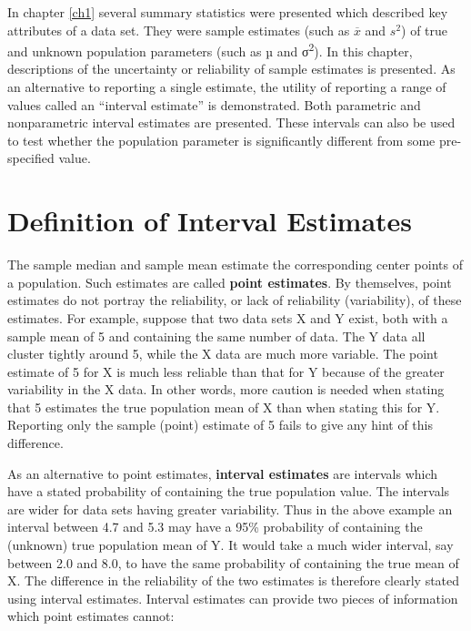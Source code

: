 \documentclass[]{book}
\begin{document}
In chapter \ref{ch1} several summary statistics were presented which described key attributes of a data set. They were sample estimates (such as \(\overline{x}\) and \(s^{2}\)) of true and unknown population parameters (such as µ and σ\textsuperscript{2}). In this chapter, descriptions of the uncertainty or reliability of sample estimates is presented. As an alternative to reporting a single estimate, the utility of reporting a range of values called an ``interval estimate'' is demonstrated. Both parametric and nonparametric interval estimates are presented. These intervals can also be used to test whether the population parameter is significantly different from some pre-specified value.

\hypertarget{definition-of-interval-estimates}{%
\section{Definition of Interval Estimates}\label{definition-of-interval-estimates}}

The sample median and sample mean estimate the corresponding center points of a population. Such estimates are called \textbf{point estimates}. By themselves, point estimates do not portray the reliability, or lack of reliability (variability), of these estimates. For example, suppose that two data sets X and Y exist, both with a sample mean of 5 and containing the same number of data. The Y data all cluster tightly around 5, while the X data are much more variable. The point estimate of 5 for X is much less reliable than that for Y because of the greater variability in the X data. In other words, more caution is needed when stating that 5 estimates the true population mean of X than when stating this for Y. Reporting only the sample (point) estimate of 5 fails to give any hint of this difference.

As an alternative to point estimates, \textbf{interval estimates} are intervals which have a stated probability of containing the true population value. The intervals are wider for data sets having greater variability. Thus in the above example an interval between 4.7 and 5.3 may have a 95\% probability of containing the (unknown) true population mean of Y. It would take a much wider interval, say between 2.0 and 8.0, to have the same probability of containing the true mean of X. The difference in the reliability of the two estimates is therefore clearly stated using interval estimates. Interval estimates can provide two pieces of information which point estimates cannot:
\end{document}
